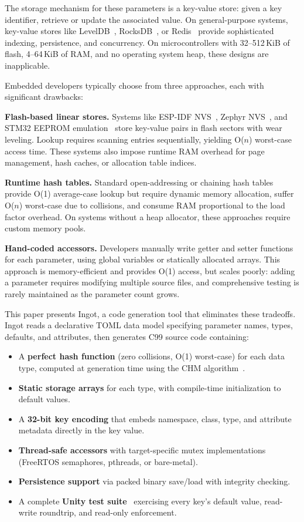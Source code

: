 \documentclass[10pt,twocolumn,letterpaper]{article}
\begin{document}
The storage mechanism for these parameters is a key-value store: given
a key identifier, retrieve or update the associated value.  On
general-purpose systems, key-value stores like LevelDB~\cite{leveldb},
RocksDB~\cite{rocksdb}, or Redis~\cite{redis} provide sophisticated
indexing, persistence, and concurrency.  On microcontrollers with
32--512\,KiB of flash, 4--64\,KiB of RAM, and no operating system
heap, these designs are inapplicable.

Embedded developers typically choose from three approaches, each with
significant drawbacks:

\textbf{Flash-based linear stores.}  Systems like ESP-IDF
NVS~\cite{esp-nvs}, Zephyr NVS~\cite{zephyr-nvs}, and STM32 EEPROM
emulation~\cite{stm32-eeprom} store key-value pairs in flash sectors
with wear leveling.  Lookup requires scanning entries sequentially,
yielding O($n$) worst-case access time.  These systems also impose
runtime RAM overhead for page management, hash caches, or allocation
table indices.

\textbf{Runtime hash tables.}  Standard open-addressing or chaining
hash tables provide O(1) average-case lookup but require dynamic
memory allocation, suffer O($n$) worst-case due to collisions, and
consume RAM proportional to the load factor overhead.  On systems
without a heap allocator, these approaches require custom memory
pools.

\textbf{Hand-coded accessors.}  Developers manually write getter and
setter functions for each parameter, using global variables or
statically allocated arrays.  This approach is memory-efficient and
provides O(1) access, but scales poorly: adding a parameter requires
modifying multiple source files, and comprehensive testing is rarely
maintained as the parameter count grows.

This paper presents Ingot, a code generation tool that eliminates
these tradeoffs.  Ingot reads a declarative TOML data model specifying
parameter names, types, defaults, and attributes, then generates C99
source code containing:

\begin{itemize}
    \item A \textbf{perfect hash function} (zero collisions, O(1)
        worst-case) for each data type, computed at generation time
        using the CHM algorithm~\cite{chm-1992}.
    \item \textbf{Static storage arrays} for each type, with
        compile-time initialization to default values.
    \item A \textbf{32-bit key encoding} that embeds namespace, class,
        type, and attribute metadata directly in the key value.
    \item \textbf{Thread-safe accessors} with target-specific mutex
        implementations (FreeRTOS semaphores, pthreads, or bare-metal).
    \item \textbf{Persistence support} via packed binary save/load
        with integrity checking.
    \item A complete \textbf{Unity test suite}~\cite{unity} exercising
        every key's default value, read-write roundtrip, and read-only
        enforcement.
\end{itemize}
\end{document}

